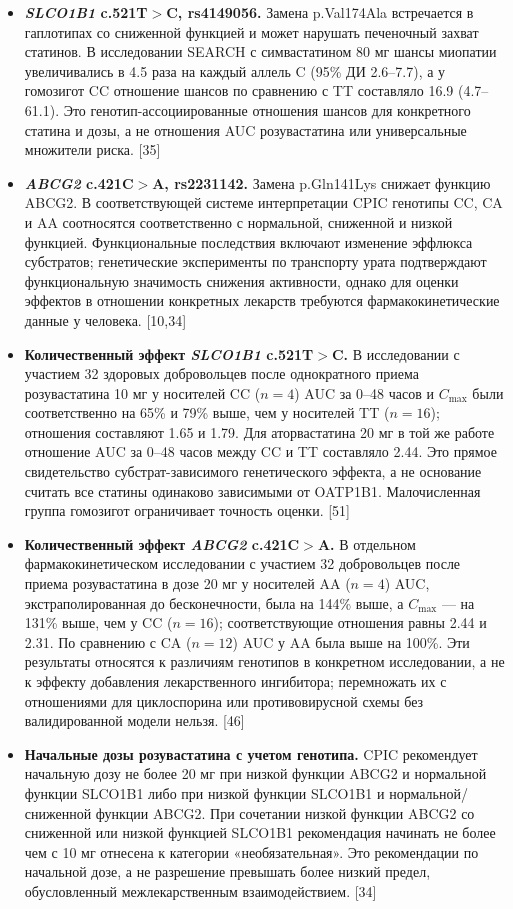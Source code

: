 \documentclass[11pt]{article}
\begin{document}
\begin{itemize}
\item \textbf{\textit{SLCO1B1} c.521T\(>\)C, rs4149056.} Замена p.Val174Ala встречается в гаплотипах со сниженной функцией и может нарушать печеночный захват статинов. В исследовании SEARCH с симвастатином 80 мг шансы миопатии увеличивались в 4.5 раза на каждый аллель C (95\% ДИ 2.6--7.7), а у гомозигот CC отношение шансов по сравнению с TT составляло 16.9 (4.7--61.1). Это генотип-ассоциированные отношения шансов для конкретного статина и дозы, а не отношения AUC розувастатина или универсальные множители риска. [35]
\item \textbf{\textit{ABCG2} c.421C\(>\)A, rs2231142.} Замена p.Gln141Lys снижает функцию ABCG2. В соответствующей системе интерпретации CPIC генотипы CC, CA и AA соотносятся соответственно с нормальной, сниженной и низкой функцией. Функциональные последствия включают изменение эффлюкса субстратов; генетические эксперименты по транспорту урата подтверждают функциональную значимость снижения активности, однако для оценки эффектов в отношении конкретных лекарств требуются фармакокинетические данные у человека. [10,34]
\item \textbf{Количественный эффект \textit{SLCO1B1} c.521T\(>\)C.} В исследовании с участием 32 здоровых добровольцев после однократного приема розувастатина 10 мг у носителей CC (\(n=4\)) AUC за 0--48 часов и \(C_{\max}\) были соответственно на 65\% и 79\% выше, чем у носителей TT (\(n=16\)); отношения составляют 1.65 и 1.79. Для аторвастатина 20 мг в той же работе отношение AUC за 0--48 часов между CC и TT составляло 2.44. Это прямое свидетельство субстрат-зависимого генетического эффекта, а не основание считать все статины одинаково зависимыми от OATP1B1. Малочисленная группа гомозигот ограничивает точность оценки. [51]
\item \textbf{Количественный эффект \textit{ABCG2} c.421C\(>\)A.} В отдельном фармакокинетическом исследовании с участием 32 добровольцев после приема розувастатина в дозе 20 мг у носителей AA (\(n=4\)) AUC, экстраполированная до бесконечности, была на 144\% выше, а \(C_{\max}\) --- на 131\% выше, чем у CC (\(n=16\)); соответствующие отношения равны 2.44 и 2.31. По сравнению с CA (\(n=12\)) AUC у AA была выше на 100\%. Эти результаты относятся к различиям генотипов в конкретном исследовании, а не к эффекту добавления лекарственного ингибитора; перемножать их с отношениями для циклоспорина или противовирусной схемы без валидированной модели нельзя. [46]
\item \textbf{Начальные дозы розувастатина с учетом генотипа.} CPIC рекомендует начальную дозу не более 20 мг при низкой функции ABCG2 и нормальной функции SLCO1B1 либо при низкой функции SLCO1B1 и нормальной/сниженной функции ABCG2. При сочетании низкой функции ABCG2 со сниженной или низкой функцией SLCO1B1 рекомендация начинать не более чем с 10 мг отнесена к категории «необязательная». Это рекомендации по начальной дозе, а не разрешение превышать более низкий предел, обусловленный межлекарственным взаимодействием. [34]

\end{itemize}
\end{document}
